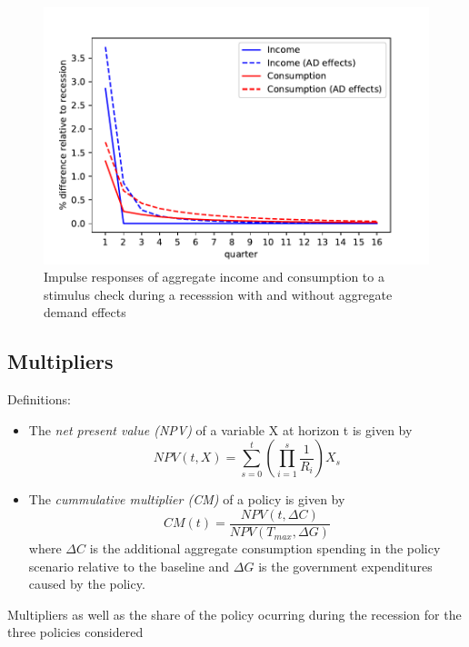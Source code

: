 \documentclass[11pt]{article}
\begin{document}
	\begin{figure}
		\centering
		\includegraphics[width=0.8\linewidth]{../Code/HA-Models/FromPandemicCode/Figures/recession_Check_relrecession}
		\caption{Impulse responses of aggregate income and consumption to a stimulus check during a recesssion with and without aggregate demand effects}
		\label{fig:recessioncheckrelrecession}
	\end{figure}

	\FloatBarrier
	\subsection{Multipliers}
	
	Definitions:
	\begin{itemize}
		\item The \textit{net present value (NPV)} of a variable X at horizon t is given by
		\begin{equation}
			NPV(t,X) = \sum_{s=0}^{t} \left( \prod_{i=1}^{s} \frac{1}{R_i} \right) X_s
		\end{equation}
		\item The \textit{cummulative multiplier (CM)} of a policy is given by
		\begin{equation}
			CM(t) = \frac{NPV(t,\Delta C)}{NPV (T_{max},\Delta G)}
		\end{equation}
		where $\Delta C$ is the additional aggregate consumption spending in the policy scenario relative to the baseline and $\Delta G$ is the government expenditures caused by the policy.
	\end{itemize}
	
	\begin{table} 
		\center
		
		\caption{Multipliers as well as the share of the policy ocurring during the recession for the three policies considered}
		\label{tab:Multiplier}
	\end{table}
	
\end{document}
